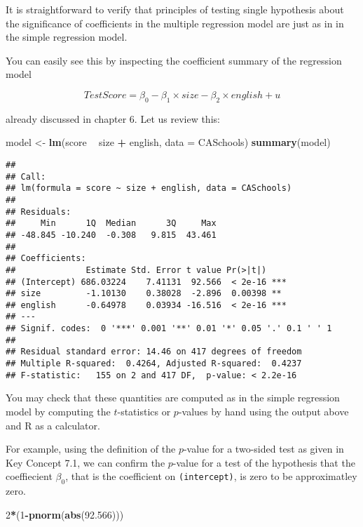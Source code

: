 \documentclass[]{book}
\newenvironment{Shaded}{\begin{snugshade}}{\end{snugshade}}
\newcommand{\KeywordTok}[1]{\textcolor[rgb]{0.13,0.29,0.53}{\textbf{#1}}}
\newcommand{\DataTypeTok}[1]{\textcolor[rgb]{0.13,0.29,0.53}{#1}}
\newcommand{\DecValTok}[1]{\textcolor[rgb]{0.00,0.00,0.81}{#1}}
\newcommand{\FloatTok}[1]{\textcolor[rgb]{0.00,0.00,0.81}{#1}}
\newcommand{\StringTok}[1]{\textcolor[rgb]{0.31,0.60,0.02}{#1}}
\newcommand{\OperatorTok}[1]{\textcolor[rgb]{0.81,0.36,0.00}{\textbf{#1}}}
\newcommand{\NormalTok}[1]{#1}
\theoremstyle{definition}
\theoremstyle{definition}
\theoremstyle{definition}
\theoremstyle{remark}
\begin{document}
It is straightforward to verify that principles of testing single
hypothesis about the significance of coefficients in the multiple
regression model are just as in in the simple regression model.

You can easily see this by inspecting the coefficient summary of the
regression model

\[ TestScore = \beta_0 - \beta_1 \times size - \beta_2 \times english + u \]

already discussed in chapter 6. Let us review this:

\begin{Shaded}
\begin{Highlighting}[]
\NormalTok{model <-}\StringTok{ }\KeywordTok{lm}\NormalTok{(score }\OperatorTok{~}\StringTok{ }\NormalTok{size }\OperatorTok{+}\StringTok{ }\NormalTok{english, }\DataTypeTok{data =}\NormalTok{ CASchools)}
\KeywordTok{summary}\NormalTok{(model)}
\end{Highlighting}
\end{Shaded}

\begin{verbatim}
## 
## Call:
## lm(formula = score ~ size + english, data = CASchools)
## 
## Residuals:
##     Min      1Q  Median      3Q     Max 
## -48.845 -10.240  -0.308   9.815  43.461 
## 
## Coefficients:
##              Estimate Std. Error t value Pr(>|t|)    
## (Intercept) 686.03224    7.41131  92.566  < 2e-16 ***
## size         -1.10130    0.38028  -2.896  0.00398 ** 
## english      -0.64978    0.03934 -16.516  < 2e-16 ***
## ---
## Signif. codes:  0 '***' 0.001 '**' 0.01 '*' 0.05 '.' 0.1 ' ' 1
## 
## Residual standard error: 14.46 on 417 degrees of freedom
## Multiple R-squared:  0.4264, Adjusted R-squared:  0.4237 
## F-statistic:   155 on 2 and 417 DF,  p-value: < 2.2e-16
\end{verbatim}

You may check that these quantities are computed as in the simple
regression model by computing the \(t\)-statistics or \(p\)-values by
hand using the output above and R as a calculator.

For example, using the definition of the \(p\)-value for a two-sided
test as given in Key Concept 7.1, we can confirm the \(p\)-value for a
test of the hypothesis that the coeffiecient \(\beta_0\), that is the
coefficient on \texttt{(intercept)}, is zero to be approximatley zero.

\begin{Shaded}
\begin{Highlighting}[]
\DecValTok{2}\OperatorTok{*}\NormalTok{(}\DecValTok{1}\OperatorTok{-}\KeywordTok{pnorm}\NormalTok{(}\KeywordTok{abs}\NormalTok{(}\FloatTok{92.566}\NormalTok{)))}
\end{Highlighting}
\end{Shaded}
\end{document}
